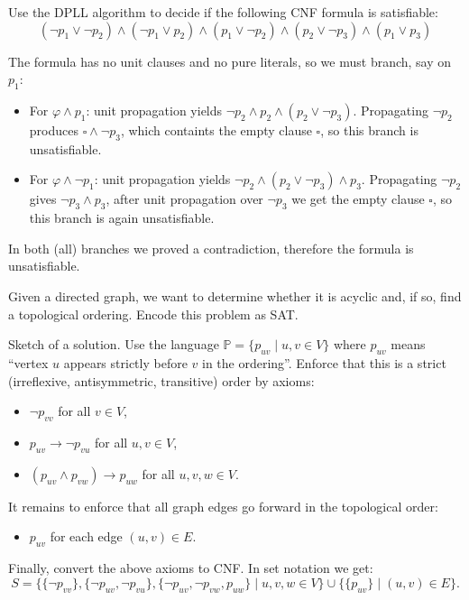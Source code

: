 \begin{problem} \label{problem:dpll}

    Use the DPLL algorithm to decide if the following CNF formula is satisfiable:
    $$ 
    (\neg p_1 \lor \neg p_2)\land( \neg p_1 \lor p_2)\land( p_1 \lor \neg p_2)\land( p_2 \lor \neg p_3)\land( p_1 \lor p_3)
    $$

    \begin{solution}
        The formula has no unit clauses and no pure literals, so we must branch, say on $p_1$:
        \begin{itemize}
            \item For $\varphi\land p_1$: unit propagation yields $\neg p_2\land p_2\land( p_2 \lor \neg p_3)$. Propagating $\neg p_2$ produces $\square\land\neg p_3$, which containts the empty clause $\square$, so this branch is unsatisfiable.
            \item For $\varphi\land \neg p_1$: unit propagation yields $\neg p_2\land( p_2 \lor \neg p_3)\land p_3$. Propagating $\neg p_2$ gives $\neg p_3\land p_3$, after unit propagation over $\neg p_3$ we get the empty clause $\square$, so this branch is again unsatisfiable.            
        \end{itemize}
        In both (all) branches we proved a contradiction, therefore the formula is unsatisfiable.                      
    \end{solution}

\end{problem}


\begin{problem}

    Given a directed graph, we want to determine whether it is acyclic and, if so, find a topological ordering. Encode this problem as SAT.

    \begin{solution}
        Sketch of a solution. Use the language $\mathbb P=\{p_{uv}\mid u,v\in V\}$ where $p_{uv}$ means “vertex $u$ appears strictly before $v$ in the ordering”. Enforce that this is a strict (irreflexive, antisymmetric, transitive) order by axioms:
        \begin{itemize}
            \item $\neg p_{vv}$ for all $v\in V$,
            \item $p_{uv}\to\neg p_{vu}$ for all $u,v\in V$,
            \item $(p_{uv}\land p_{vw})\to p_{uw}$ for all $u,v,w\in V$.
        \end{itemize}
        It remains to enforce that all graph edges go forward in the topological order:
        \begin{itemize}
            \item $p_{uv}$ for each edge $(u,v)\in E$.
        \end{itemize}
        Finally, convert the above axioms to CNF. In set notation we get:
        $$
        S=\{\{\neg p_{vv}\},\{\neg p_{uv},\neg p_{vu}\},\{\neg p_{uv},\neg p_{vw},p_{uw}\} \mid u,v,w\in V\}\cup\{\{p_{uv}\}\mid(u,v)\in E\}.
        $$
    \end{solution}

\end{problem}
    
